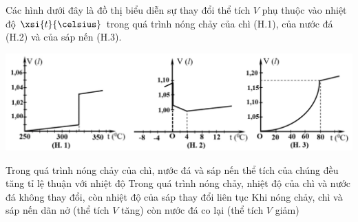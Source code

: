 \begin{ex}
	Các hình dưới đây là đồ thị biểu diễn sự thay đổi thể tích 	$V$ phụ thuộc vào nhiệt độ $\xsi{t}{\celsius}$ trong quá trình nóng chảy của chì (H.1), của nước đá (H.2) và của sáp nến (H.3).
	\begin{center}
		\includegraphics[scale=0.4]{figs/G12Y24B1-1}
	\end{center}
	{Trong quá trình nóng chảy của chì, nước đá và sáp nến thể tích của chúng đều tăng tỉ lệ thuận với nhiệt độ}
	{\True Trong quá trình nóng chảy, nhiệt độ của chì và nước đá không thay đổi, còn nhiệt độ của sáp thay đổi liên tục}
	{\True Khi nóng chảy, chì và sáp nến dãn nở (thể tích $V$ tăng) còn nước đá co lại (thể tích $V$ giảm)}
	\loigiai{}
\end{ex}
